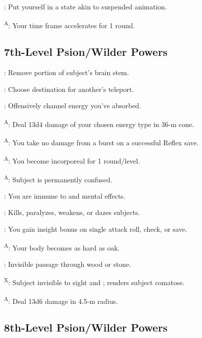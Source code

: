 : Put yourself in a state akin to suspended animation.

\textsuperscript{A}: Your time frame accelerates for 1 round.




\subsection{7th-Level Psion/Wilder Powers}

: Remove portion of subject's brain stem.

: Choose destination for another's teleport.

: Offensively channel energy you've absorbed.

\textsuperscript{A}: Deal 13d4 damage of your chosen energy type in 36-m cone.

\textsuperscript{A}: You take no damage from a burst on a successful Reflex save.

\textsuperscript{A}: You become incorporeal for 1 round/level.

\textsuperscript{A}: Subject is permanently confused.

: You are immune to  and mental effects.

: Kills, paralyzes, weakens, or dazes subjects.

: You gain insight bonus on single attack roll, check, or save.

\textsuperscript{A}: Your body becomes as hard as oak.

: Invisible passage through wood or stone.

\textsuperscript{X}: Subject invisible to sight and ; renders subject comatose.

\textsuperscript{A}: Deal 13d6 damage in 4.5-m radius.




\subsection{8th-Level Psion/Wilder Powers}

